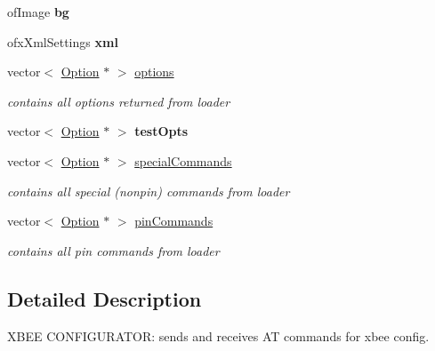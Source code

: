 \begin{DoxyCompactItemize}
\item 
\hypertarget{classtest_app_af5275cd3950e2ce501f02a32815a8b7a}{
ofImage {\bfseries bg}}
\label{classtest_app_af5275cd3950e2ce501f02a32815a8b7a}

\item 
\hypertarget{classtest_app_a8f9bc3a319dd757c1b2c9ec3c54cbf11}{
ofxXmlSettings {\bfseries xml}}
\label{classtest_app_a8f9bc3a319dd757c1b2c9ec3c54cbf11}

\item 
\hypertarget{classtest_app_a3500bd9066da0482d7b4bd6399d0eda0}{
vector$<$ \hyperlink{class_option}{Option} $\ast$ $>$ \hyperlink{classtest_app_a3500bd9066da0482d7b4bd6399d0eda0}{options}}
\label{classtest_app_a3500bd9066da0482d7b4bd6399d0eda0}

\begin{DoxyCompactList}\small\item\em contains all options returned from loader \end{DoxyCompactList}\item 
\hypertarget{classtest_app_ab684f35985efa1134ef552f690f00d33}{
vector$<$ \hyperlink{class_option}{Option} $\ast$ $>$ {\bfseries testOpts}}
\label{classtest_app_ab684f35985efa1134ef552f690f00d33}

\item 
\hypertarget{classtest_app_a0e96c4c9258b8cf5c981c95ecc147dfe}{
vector$<$ \hyperlink{class_option}{Option} $\ast$ $>$ \hyperlink{classtest_app_a0e96c4c9258b8cf5c981c95ecc147dfe}{specialCommands}}
\label{classtest_app_a0e96c4c9258b8cf5c981c95ecc147dfe}

\begin{DoxyCompactList}\small\item\em contains all special (nonpin) commands from loader \end{DoxyCompactList}\item 
\hypertarget{classtest_app_aa1aa16a3cb0615961f94096a6be5c826}{
vector$<$ \hyperlink{class_option}{Option} $\ast$ $>$ \hyperlink{classtest_app_aa1aa16a3cb0615961f94096a6be5c826}{pinCommands}}
\label{classtest_app_aa1aa16a3cb0615961f94096a6be5c826}

\begin{DoxyCompactList}\small\item\em contains all pin commands from loader \end{DoxyCompactList}\end{DoxyCompactItemize}


\subsection{Detailed Description}
XBEE CONFIGURATOR: sends and receives AT commands for xbee config. 

